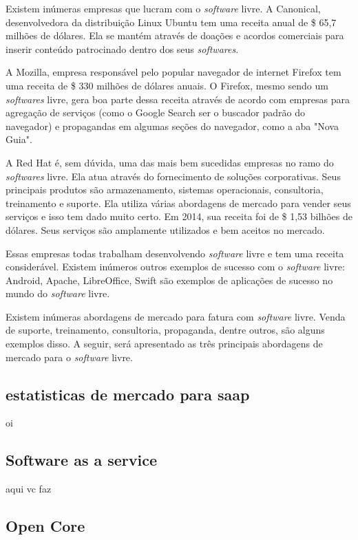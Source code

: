 \documentclass{classe_cn}                 %
\begin{document}
Existem inúmeras empresas que lucram com o \textit{software} livre. A Canonical, desenvolvedora da distribuição Linux Ubuntu tem uma receita anual de \$ 65,7 milhões de dólares. Ela se mantém através de doações e acordos comerciais para inserir conteúdo patrocinado dentro dos seus \textit{softwares}.

A Mozilla, empresa responsável pelo popular navegador de internet Firefox tem uma receita de \$ 330 milhões de dólares anuais. O Firefox, mesmo sendo  um \textit{softwares} livre, gera boa parte dessa receita através de acordo com empresas para agregação de serviços (como o Google Search ser o buscador padrão do navegador) e propagandas em algumas seções do navegador, como a aba "Nova Guia".

A Red Hat é, sem dúvida, uma das mais bem sucedidas empresas no ramo do \textit{softwares} livre. Ela atua através do fornecimento de soluções corporativas. Seus principais produtos são armazenamento, sistemas operacionais, consultoria, treinamento e suporte. Ela utiliza várias abordagens de mercado para vender seus serviços e isso tem dado muito certo. Em 2014, sua receita foi de \$ 1,53 bilhões de dólares. Seus serviços são amplamente utilizados e bem aceitos no mercado.

Essas empresas todas trabalham desenvolvendo \textit{software} livre e tem uma receita considerável. Existem inúmeros outros exemplos de sucesso com o \textit{software} livre: Android, Apache, LibreOffice, Swift são exemplos de aplicações de sucesso no mundo do \textit{software} livre. 

Existem inúmeras abordagens de mercado para fatura com \textit{software} livre. Venda de suporte, treinamento, consultoria, propaganda, dentre outros, são alguns exemplos disso. A seguir, será apresentado as três principais abordagens de mercado para o \textit{software} livre.

\subsection{estatisticas de mercado para saap}
oi


\subsection{Software as a service}

aqui vc faz

\subsection{Open Core}
\end{document}
